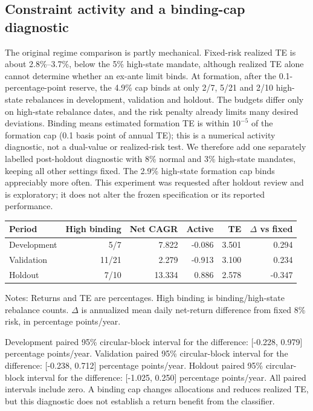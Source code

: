 \documentclass[11pt,a4paper]{article}
\begin{document}
\subsection{Constraint activity and a binding-cap diagnostic}
The original regime comparison is partly mechanical. Fixed-risk realized TE is about 2.8\%--3.7\%, below the 5\% high-state mandate, although realized TE alone cannot determine whether an ex-ante limit binds. At formation, after the 0.1-percentage-point reserve, the 4.9\% cap binds at only 2/7, 5/21 and 2/10 high-state rebalances in development, validation and holdout. The budgets differ only on high-state rebalance dates, and the risk penalty already limits many desired deviations.
Binding means estimated formation TE is within $10^{-5}$ of the formation cap (0.1 basis point of annual TE); this is a numerical activity diagnostic, not a dual-value or realized-risk test.
We therefore add one separately labelled post-holdout diagnostic with 8\% normal and 3\% high-state mandates, keeping all other settings fixed. The 2.9\% high-state formation cap binds appreciably more often. This experiment was requested after holdout review and is exploratory; it does not alter the frozen specification or its reported performance.
\begin{center}\begin{minipage}{\textwidth}\small
{}\label{tab-tight-regime}
\begin{tabular*}{\textwidth}{@{\extracolsep{\fill}}lrrrrr@{}}\toprule
Period & High binding & Net CAGR & Active & TE & $\Delta$ vs fixed\\\midrule
Development & 5/7 & 7.822 & -0.086 & 3.501 & 0.294\\
Validation & 11/21 & 2.279 & -0.913 & 3.100 & 0.234\\
Holdout & 7/10 & 13.334 & 0.886 & 2.578 & -0.347\\
\bottomrule\end{tabular*}\par\vspace{4pt}\footnotesize
Notes: Returns and TE are percentages. High binding is binding/high-state rebalance counts. $\Delta$ is annualized mean daily net-return difference from fixed 8\% risk, in percentage points/year.
\end{minipage}\end{center}
Development paired 95\% circular-block interval for the difference: [-0.228, 0.979] percentage points/year.
Validation paired 95\% circular-block interval for the difference: [-0.238, 0.712] percentage points/year.
Holdout paired 95\% circular-block interval for the difference: [-1.025, 0.250] percentage points/year.
All paired intervals include zero. A binding cap changes allocations and reduces realized TE, but this diagnostic does not establish a return benefit from the classifier.
\end{document}
